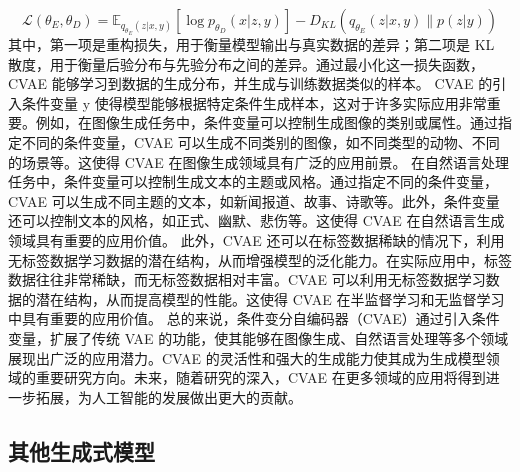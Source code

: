 \begin{equation}
  \mathcal{L}(\theta_E, \theta_D) = \mathbb{E}_{q_{\theta_E}(z|x,y)} \left[ \log p_{\theta_D}(x|z,y) \right] - D_{KL}(q_{\theta_E}(z|x,y) \| p(z|y))
\end{equation}
其中，第一项是重构损失，用于衡量模型输出与真实数据的差异；第二项是 KL 散度，用于衡量后验分布与先验分布之间的差异。通过最小化这一损失函数，CVAE 能够学习到数据的生成分布，并生成与训练数据类似的样本。
CVAE 的引入条件变量 y 使得模型能够根据特定条件生成样本，这对于许多实际应用非常重要。例如，在图像生成任务中，条件变量可以控制生成图像的类别或属性。通过指定不同的条件变量，CVAE 可以生成不同类别的图像，如不同类型的动物、不同的场景等。这使得 CVAE 在图像生成领域具有广泛的应用前景。
在自然语言处理任务中，条件变量可以控制生成文本的主题或风格。通过指定不同的条件变量，CVAE 可以生成不同主题的文本，如新闻报道、故事、诗歌等。此外，条件变量还可以控制文本的风格，如正式、幽默、悲伤等。这使得 CVAE 在自然语言生成领域具有重要的应用价值。
此外，CVAE 还可以在标签数据稀缺的情况下，利用无标签数据学习数据的潜在结构，从而增强模型的泛化能力。在实际应用中，标签数据往往非常稀缺，而无标签数据相对丰富。CVAE 可以利用无标签数据学习数据的潜在结构，从而提高模型的性能。这使得 CVAE 在半监督学习和无监督学习中具有重要的应用价值。
总的来说，条件变分自编码器（CVAE）通过引入条件变量，扩展了传统 VAE 的功能，使其能够在图像生成、自然语言处理等多个领域展现出广泛的应用潜力。CVAE 的灵活性和强大的生成能力使其成为生成模型领域的重要研究方向。未来，随着研究的深入，CVAE 在更多领域的应用将得到进一步拓展，为人工智能的发展做出更大的贡献。
\subsection{其他生成式模型}